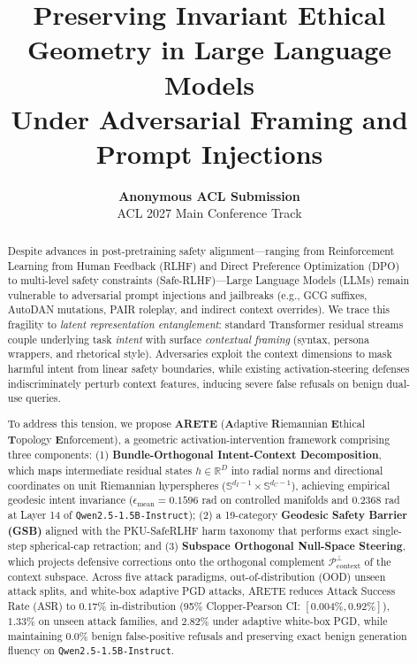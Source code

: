 \documentclass[11pt,twocolumn,a4paper]{article}
\title{\textbf{Preserving Invariant Ethical Geometry in Large Language Models\\Under Adversarial Framing and Prompt Injections}}
\author{
  \textbf{Anonymous ACL Submission}\\
  ACL 2027 Main Conference Track
}
\date{}
\begin{document}
\maketitle

\begin{abstract}
Despite advances in post-pretraining safety alignment---ranging from Reinforcement Learning from Human Feedback (RLHF) and Direct Preference Optimization (DPO) to multi-level safety constraints (Safe-RLHF)---Large Language Models (LLMs) remain vulnerable to adversarial prompt injections and jailbreaks (e.g., GCG suffixes, AutoDAN mutations, PAIR roleplay, and indirect context overrides). We trace this fragility to \textit{latent representation entanglement}: standard Transformer residual streams couple underlying task \textit{intent} with surface \textit{contextual framing} (syntax, persona wrappers, and rhetorical style). Adversaries exploit the context dimensions to mask harmful intent from linear safety boundaries, while existing activation-steering defenses indiscriminately perturb context features, inducing severe false refusals on benign dual-use queries.

To address this tension, we propose \textbf{ARETE} (\textbf{A}daptive \textbf{R}iemannian \textbf{E}thical \textbf{T}opology \textbf{E}nforcement), a geometric activation-intervention framework comprising three components: (1) \textbf{Bundle-Orthogonal Intent-Context Decomposition}, which maps intermediate residual states $h \in \mathbb{R}^D$ into radial norms and directional coordinates on unit Riemannian hyperspheres ($\mathbb{S}^{d_I-1} \times \mathbb{S}^{d_C-1}$), achieving empirical geodesic intent invariance ($\epsilon_{\text{mean}} = 0.1596$ rad on controlled manifolds and $0.2368$ rad at Layer 14 of \texttt{Qwen2.5-1.5B-Instruct}); (2) a 19-category \textbf{Geodesic Safety Barrier (GSB)} aligned with the PKU-SafeRLHF harm taxonomy that performs exact single-step spherical-cap retraction; and (3) \textbf{Subspace Orthogonal Null-Space Steering}, which projects defensive corrections onto the orthogonal complement $\mathcal{P}_{\text{context}}^\perp$ of the context subspace. Across five attack paradigms, out-of-distribution (OOD) unseen attack splits, and white-box adaptive PGD attacks, ARETE reduces Attack Success Rate (ASR) to $0.17\%$ in-distribution (95\% Clopper-Pearson CI: $[0.004\%, 0.92\%]$), $1.33\%$ on unseen attack families, and $2.82\%$ under adaptive white-box PGD, while maintaining $0.0\%$ benign false-positive refusals and preserving exact benign generation fluency on \texttt{Qwen2.5-1.5B-Instruct}.
\end{abstract}
\end{document}
